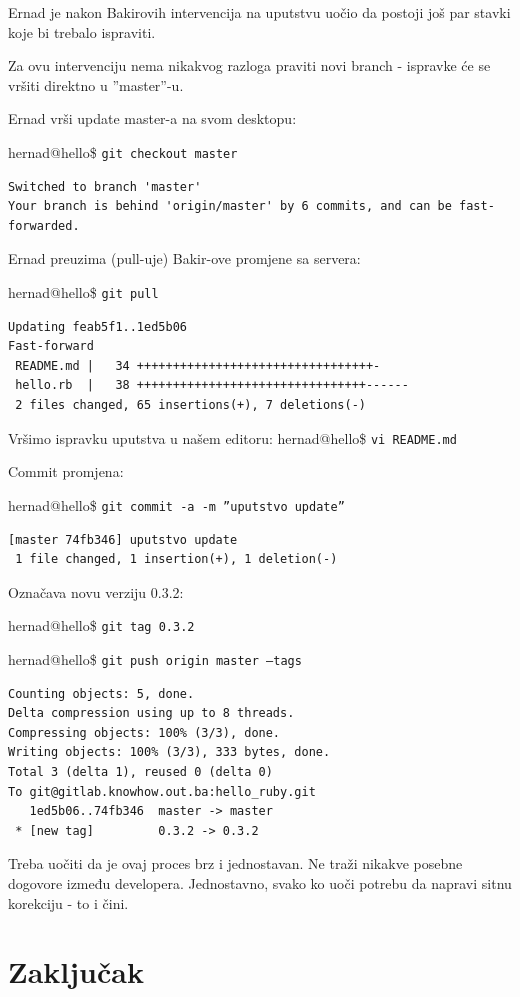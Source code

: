 \documentclass[times, utf8, seminar]{fit}
\begin{document}
\begin{itemize}
Ernad je nakon Bakirovih intervencija na uputstvu uočio da postoji još par stavki koje bi trebalo ispraviti.

Za ovu intervenciju nema nikakvog razloga praviti novi branch - ispravke će se vršiti direktno u ''master''-u.

Ernad vrši update master-a na svom desktopu:

hernad@hello\ruby\$ \texttt{git checkout master}
\begin{lstlisting}
Switched to branch 'master'
Your branch is behind 'origin/master' by 6 commits, and can be fast-forwarded.
\end{lstlisting}

Ernad preuzima (pull-uje) Bakir-ove promjene sa servera:

hernad@hello\ruby\$ \texttt{git pull}
\begin{lstlisting}
Updating feab5f1..1ed5b06
Fast-forward
 README.md |   34 +++++++++++++++++++++++++++++++++-
 hello.rb  |   38 ++++++++++++++++++++++++++++++++------
 2 files changed, 65 insertions(+), 7 deletions(-)
\end{lstlisting}

Vršimo ispravku uputstva u našem editoru:
hernad@hello\ruby\$ \texttt{vi README.md}

Commit promjena:

hernad@hello\ruby\$ \texttt{git commit -a -m ''uputstvo update''}
\begin{lstlisting}
[master 74fb346] uputstvo update
 1 file changed, 1 insertion(+), 1 deletion(-)
\end{lstlisting}

Označava novu verziju 0.3.2:

hernad@hello\ruby\$ \texttt{git tag 0.3.2}

hernad@hello\ruby\$ \texttt{git push origin master --tags}
\begin{lstlisting}
Counting objects: 5, done.
Delta compression using up to 8 threads.
Compressing objects: 100% (3/3), done.
Writing objects: 100% (3/3), 333 bytes, done.
Total 3 (delta 1), reused 0 (delta 0)
To git@gitlab.knowhow.out.ba:hello_ruby.git
   1ed5b06..74fb346  master -> master
 * [new tag]         0.3.2 -> 0.3.2
\end{lstlisting}

Treba uočiti da je ovaj proces brz i jednostavan. Ne traži nikakve posebne dogovore između developera.
Jednostavno, svako ko uoči potrebu da napravi sitnu korekciju - to i čini.

\chapter{Zaključak}


\end{itemize}
\end{document}
